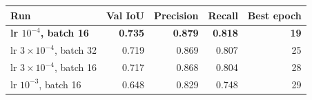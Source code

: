 \begin{tabular}{lrrrr}
\toprule
Run & Val IoU & Precision & Recall & Best epoch \\
\midrule
\textbf{lr $10^{-4}$, batch 16} & \textbf{0.735} & \textbf{0.879} & \textbf{0.818} & \textbf{19} \\
lr $3{\times}10^{-4}$, batch 32 & 0.719 & 0.869 & 0.807 & 25 \\
lr $3{\times}10^{-4}$, batch 16 & 0.717 & 0.868 & 0.804 & 28 \\
lr $10^{-3}$, batch 16 & 0.648 & 0.829 & 0.748 & 29 \\
\bottomrule
\end{tabular}
